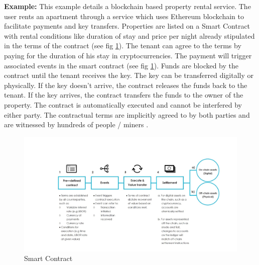 \textbf{Example:}
This example details a blockchain based property rental service. The user rents an apartment through a service which uses Ethereum blockchain to facilitate payments and   key transfers. Properties are listed on a Smart Contract with rental conditions like duration of stay and price per night already stipulated in the terms of the contract (see fig \ref{fig:smartcontract}). The tenant can agree to the terms by paying for the duration of his stay in cryptocurrencies. The payment will trigger associated events in the smart contract (see fig \ref{fig:smartcontract}).  Funds are blocked by the contract until the tenant receives the key. The key can be transferred digitally or physically. If the key doesn’t arrive, the contract releases the funds back to the tenant. If the key arrives, the contract transfers the funds to the owner of the property. The contract is automatically executed and cannot be interfered by either party. The contractual terms are implicitly agreed to by both parties and are witnessed by hundreds of people / miners \cite{misc:024}.   

\begin{figure}[h]
	\centering
    \includegraphics[width=180mm,scale=0.5]{figs/smartcontract}
	\caption{Smart Contract \cite{paper:009}} 
	\label{fig:smartcontract}
\end{figure}
\vspace{0.5cm} 
